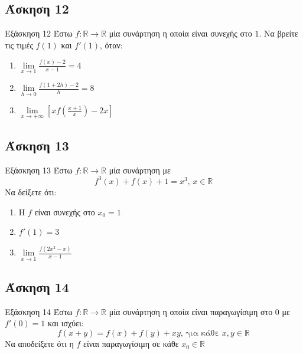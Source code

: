 \documentclass[greek]{beamer}
\begin{document}
\subsection{Άσκηση 12}
\begin{frame}[label=Άσκηση12]{Εξάσκηση 12}
  Έστω $f:\mathbb{R}\to\mathbb{R}$ μία συνάρτηση η οποία είναι συνεχής στο $1$. Να βρείτε τις τιμές $f(1)$ και $f'(1)$, όταν:
  \begin{enumerate}
    \item<1-> $\lim\limits_{x \to 1}{ \frac{f(x)-2}{x-1} }=4$
    \item<2-> $\lim\limits_{h \to 0}{ \frac{f(1+2h)-2}{h} }=8$
    \item<3-> $\lim\limits_{x \to +\infty}{ \left[ xf\left( \frac{x+1}{x} \right)-2x   \right]  }$
  \end{enumerate}

\end{frame}

\subsection{Άσκηση 13}
\begin{frame}[label=Άσκηση13]{Εξάσκηση 13}
  Έστω $f:\mathbb{R}\to\mathbb{R}$ μία συνάρτηση με
  $$f^3(x)+f(x)+1=x^3 \text{, } x\in\mathbb{R}$$
  Να δείξετε ότι:
  \begin{enumerate}
    \item<1-> Η $f$ είναι συνεχής στο $x_0=1$
    \item<2-> $f'(1)=3$
    \item<3-> $\lim\limits_{x \to 1}{ \frac{f(2x^2-x)}{x-1}  }$
  \end{enumerate}

\end{frame}

\subsection{Άσκηση 14}
\begin{frame}[label=Άσκηση14]{Εξάσκηση 14}
  Έστω $f:\mathbb{R}\to\mathbb{R}$ μία συνάρτηση η οποία είναι παραγωγίσιμη στο $0$ με $f'(0)=1$ και ισχύει:
  $$f(x+y)=f(x)+f(y)+xy \text{, για κάθε } x,y\in\mathbb{R}$$
  Να αποδείξετε ότι η $f$ είναι παραγωγίσιμη σε κάθε $x_0\in\mathbb{R}$

\end{frame}
\end{document}
